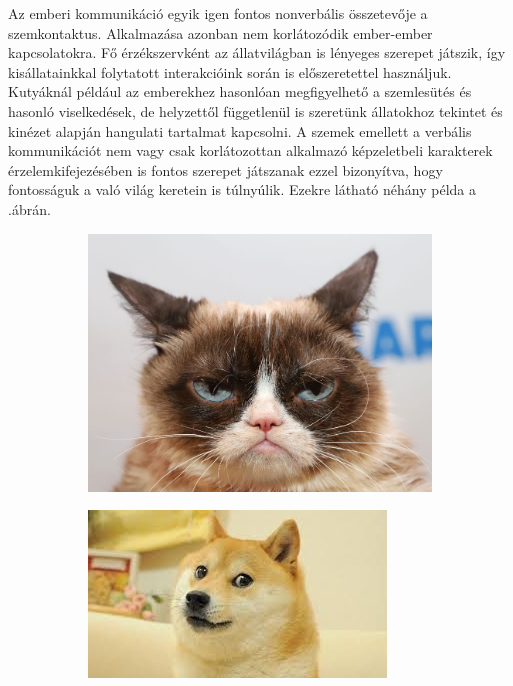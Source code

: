 Az emberi kommunikáció egyik igen fontos nonverbális összetevője a szemkontaktus. Alkalmazása azonban nem korlátozódik ember-ember kapcsolatokra. Fő érzékszervként az állatvilágban is lényeges szerepet játszik, így kisállatainkkal folytatott interakcióink során is előszeretettel használjuk. Kutyáknál például az emberekhez hasonlóan megfigyelhető a szemlesütés és hasonló viselkedések, de helyzettől függetlenül is szeretünk állatokhoz tekintet és kinézet alapján hangulati tartalmat kapcsolni. A szemek emellett a verbális kommunikációt nem vagy csak korlátozottan alkalmazó képzeletbeli karakterek érzelemkifejezésében is fontos szerepet játszanak ezzel bizonyítva, hogy fontosságuk a való világ keretein is túlnyúlik. Ezekre látható néhány példa a
.ábrán.
\begin{figure}
    \centering
    \begin{subfigure}[b]{0.24\linewidth}
        \includegraphics[width=\linewidth]{figures/eye/grumpy_cat.jpg}
    \end{subfigure}
    \begin{subfigure}[b]{0.24\linewidth}
        \includegraphics[width=\linewidth]{figures/eye/doge.jpg}

\end{subfigure}
\end{figure}
